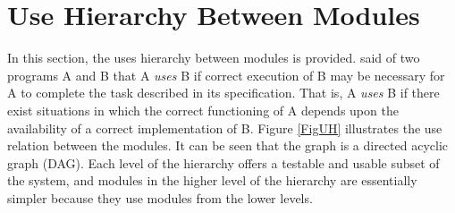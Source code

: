 \documentclass[12pt, titlepage]{article}
\newcommand{\acref}[1]{AC\ref{#1}}
\newcommand{\mref}[1]{M\ref{#1}}
\begin{document}

\section{Use Hierarchy Between Modules} \label{SecUse}

In this section, the uses hierarchy between modules is
provided. \citet{Parnas1978} said of two programs A and B that A {\em uses} B if
correct execution of B may be necessary for A to complete the task described in
its specification. That is, A {\em uses} B if there exist situations in which
the correct functioning of A depends upon the availability of a correct
implementation of B.  Figure \ref{FigUH} illustrates the use relation between
the modules. It can be seen that the graph is a directed acyclic graph
(DAG). Each level of the hierarchy offers a testable and usable subset of the
system, and modules in the higher level of the hierarchy are essentially simpler
because they use modules from the lower levels.



\end{document}

